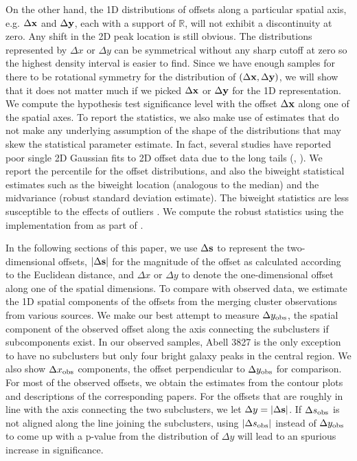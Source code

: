 On the other hand, 
the 1D distributions of offsets along a particular spatial axis, 
e.g. $\Delta {\bf x}$ and $\Delta {\bf y}$,
each with a support of $\mathbb{R}$, will not exhibit a discontinuity at zero.
Any shift in the 2D peak location is still obvious. 
The distributions represented by $\Delta x$ or $\Delta y$ 
can be symmetrical without any sharp cutoff at zero so 
the highest density interval is easier to find.
Since we have enough samples for there to be
rotational symmetry for the distribution of $(\Delta {\bf x}, \Delta {\bf y})$,
we will show that it does not
matter much if we picked $\Delta {\bf x}$ or $\Delta {\bf y}$ for the 1D representation.
We compute the hypothesis test significance level with the 
 offset $\Delta {\bf x}$ along one of the spatial axes. 
To report the statistics, we also make use of estimates that do not make any
underlying assumption of the shape of the distributions that may skew the
statistical parameter estimate.
In fact, several studies have reported poor single 2D Gaussian fits to 2D offset data
due to the long tails
(\citealt{Zitrin2012a}, \citealt{Oguri2010}).  
We report the percentile for the offset distributions, and also the biweight 
statistical estimates such as the biweight 
location (analogous to the median)
and the midvariance (robust standard deviation
estimate). The biweight statistics are less susceptible to the effects of
outliers \citep{Beers90}. We compute the robust statistics using the implementation
from \cite{astropy} as part of {}. 

In the following sections of this paper, we use $\Delta {\bf s}$  to represent the
two-dimensional offsets, $|\Delta {\bf s}|$ for the magnitude of the offset as calculated
according to the Euclidean distance, and $\Delta x$ or $\Delta y$ to denote the
one-dimensional offset along one of the spatial dimensions.
To compare with observed data, we estimate the 1D spatial components of
the offsets from the merging cluster observations from various sources.   
We make our best attempt to measure $\Delta y_{\rm obs}$, the spatial component of the
observed offset along the axis connecting the subclusters if subcomponents exist. 
In our observed samples, Abell 3827 is the only exception to have no
subclusters but only four bright galaxy peaks in the central region. 
We also show $\Delta x_{\rm obs}$ components, the offset perpendicular to
$\Delta y_{\rm obs}$ for comparison.
For most of the observed offsets, we obtain the estimates from the contour plots 
and descriptions of the corresponding papers. 
For the offsets that are roughly in line with the axis connecting the two subclusters,
we let $\Delta y = |\Delta {\bf s}|$. 
If $\Delta s_{\rm obs}$ is not aligned along the line joining the subclusters,
using $|\Delta s_{\rm obs}|$ instead of $\Delta y_{\rm obs}$ to come 
up with a p-value from the distribution of 
$\Delta y$ will lead to an spurious increase in significance.


